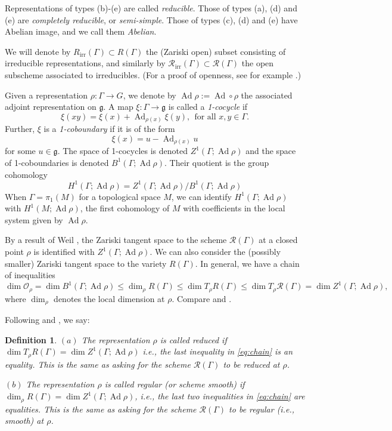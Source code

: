 \documentclass [11pt]{amsart}
\newtheorem {definition}[theorem]{Definition}
\theoremstyle{remark}
\def\O{\mathcal{O}}
\def\g{\mathfrak{g}}
\def\Rep {R}
\def\RepIrr{R_{\operatorname{irr}}}
\def\Rs {\mathscr{R}}
\def\RsIrr{\Rs_{\operatorname{irr}}}
\def\Ad {\operatorname{Ad}}
\def\O {\mathcal{O}}
\begin{document}
Representations of types (b)-(e) are called {\em reducible}. Those of types (a), (d) and (e) are {\em completely reducible}, or {\em semi-simple}. Those of types (c), (d) and (e) have Abelian image, and we call them {\em Abelian}. 


We will denote by $\RepIrr(\Gamma) \subset \Rep(\Gamma)$ the (Zariski open) subset consisting of irreducible representations, and similarly by $\RsIrr(\Gamma) \subset \Rs(\Gamma)$ the open subscheme associated to irreducibles. (For a proof of openness, see for example \cite[Proposition 27]{Sikora}.)

Given a representation $\rho: \Gamma \to G$, we denote by $\Ad \rho := \Ad \circ \rho$ the associated adjoint representation on $\g$.  A map $\xi: \Gamma \to\g$ is called a {\em 1-cocycle} if
\begin{equation}
\label{eq:1cocycle}
 \xi(xy) = \xi(x)+\Ad_{\rho(x)} \xi(y), \ \ \text{for all } x, y \in \Gamma.
 \end{equation}
Further, $\xi$ is a {\em 1-coboundary} if it is of the form
$$ \xi(x) = u - \Ad_{\rho(x)} u$$
for some $u \in \g$. The space of 1-cocycles is denoted $Z^1(\Gamma; \Ad \rho)$ and the space of 1-coboundaries is denoted $B^1(\Gamma; \Ad \rho)$. Their quotient is the group cohomology 
$$H^1(\Gamma; \Ad \rho) = Z^1(\Gamma; \Ad \rho)/B^1(\Gamma; \Ad \rho)$$
When $\Gamma =\pi_1(M)$ for a topological space $M$, we can identify $H^1(\Gamma; \Ad \rho)$ with $H^1(M; \Ad \rho)$, the first cohomology of $M$ with coefficients in the local system given by $\Ad \rho$.

By a result of Weil \cite{Weil}, the Zariski tangent space to the scheme $\Rs(\Gamma)$ at a closed point $\rho$ is identified with $Z^1(\Gamma; \Ad \rho)$. We can also consider the (possibly smaller) Zariski tangent space to the variety $\Rep(\Gamma)$. In general, we have a chain of inequalities
\begin{equation}
\label{eq:chain}
\dim \O_{\rho} = \dim B^1(\Gamma; \Ad \rho) \leq \dim_{\rho} \Rep(\Gamma) \leq \dim T_{\rho}\Rep(\Gamma) \leq \dim T_{\rho}\Rs(\Gamma) = \dim Z^1(\Gamma; \Ad \rho),
\end{equation}
where $\dim_{\rho}$ denotes the local dimension at $\rho$. Compare \cite[Chapter 2]{LubotzkyMagid} and \cite[Lemma 2.6]{Heusener}. 

Following \cite{Heusener} and \cite{Sikora}, we say:
\begin{definition}
\label{def:redreg}
$(a)$  The representation $\rho$ is called {\em reduced} if $\dim T_{\rho}\Rep(\Gamma) = \dim Z^1(\Gamma; \Ad \rho)$ i.e., the last inequality in \eqref{eq:chain} is an equality.
This is the same as asking for the scheme $\Rs(\Gamma)$ to be reduced at $\rho$.

$(b)$ The representation $\rho$ is called {\em regular} (or {\em scheme smooth}) if  $\dim_{\rho} \Rep(\Gamma) =\dim Z^1(\Gamma; \Ad \rho)$, i.e., the last two inequalities in \eqref{eq:chain} are equalities. This is the same as asking for the scheme $\Rs(\Gamma)$ to be regular (i.e., smooth) at $\rho$.
\end{definition}
\end{document}
